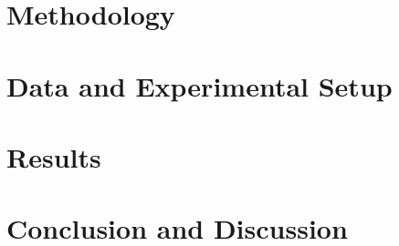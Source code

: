 \documentclass[11pt]{article}
\begin{document}
\section{Methodology}



\section{Data and Experimental Setup}



\section{Results}



\section{Conclusion and Discussion}








\newpage
\appendix
\end{document}
